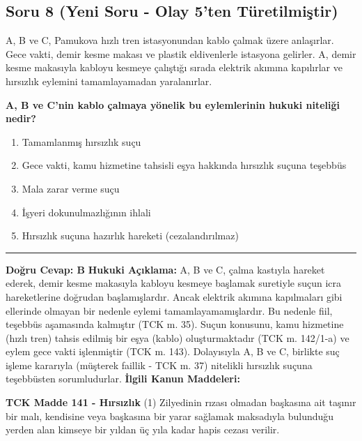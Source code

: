 \documentclass[a4paper, 11pt, twocolumn]{article}
\newenvironment{lawbox}{%
    \par\noindent
    \begin{tcolorbox}[
        colback=lawbg,
        colframe=boxcolor,
        fonttitle=\bfseries,
        boxrule=0.5pt,
        left=3pt,
        right=3pt,
        top=3pt,
        bottom=3pt,
        width=\columnwidth,
        arc=2pt,
        before skip=0.2cm,
        after skip=0.2cm
    ]
    \footnotesize\itshape
}{\end{tcolorbox}}
\begin{document}
\newpage

\subsection*{Soru 8 (Yeni Soru - Olay 5'ten Türetilmiştir)}
A, B ve C, Pamukova hızlı tren istasyonundan kablo çalmak üzere anlaşırlar. Gece vakti, demir kesme makası ve plastik eldivenlerle istasyona gelirler. A, demir kesme makasıyla kabloyu kesmeye çalıştığı sırada elektrik akımına kapılırlar ve hırsızlık eylemini tamamlayamadan yaralanırlar.

\textbf{A, B ve C'nin kablo çalmaya yönelik bu eylemlerinin hukuki niteliği nedir?}
\begin{enumerate}[label=\Alph*)]
    \item Tamamlanmış hırsızlık suçu
    \item Gece vakti, kamu hizmetine tahsisli eşya hakkında hırsızlık suçuna teşebbüs
    \item Mala zarar verme suçu
    \item İşyeri dokunulmazlığının ihlali
    \item Hırsızlık suçuna hazırlık hareketi (cezalandırılmaz)
\end{enumerate}
\vspace{0.5cm}
\hrule
\vspace{0.5cm}
\textbf{Doğru Cevap: B}
\newline
\textbf{Hukuki Açıklama:} A, B ve C, çalma kastıyla hareket ederek, demir kesme makasıyla kabloyu kesmeye başlamak suretiyle suçun icra hareketlerine doğrudan başlamışlardır. Ancak elektrik akımına kapılmaları gibi ellerinde olmayan bir nedenle eylemi tamamlayamamışlardır. Bu nedenle fiil, teşebbüs aşamasında kalmıştır (TCK m. 35). Suçun konusunu, kamu hizmetine (hızlı tren) tahsis edilmiş bir eşya (kablo) oluşturmaktadır (TCK m. 142/1-a) ve eylem gece vakti işlenmiştir (TCK m. 143). Dolayısıyla A, B ve C, birlikte suç işleme kararıyla (müşterek faillik - TCK m. 37) nitelikli hırsızlık suçuna teşebbüsten sorumludurlar.
\vspace{0.5cm}
\textbf{İlgili Kanun Maddeleri:}
\begin{lawbox}
\textbf{TCK Madde 141 - Hırsızlık}
\newline
(1) Zilyedinin rızası olmadan başkasına ait taşınır bir malı, kendisine veya başkasına bir yarar sağlamak maksadıyla bulunduğu yerden alan kimseye bir yıldan üç yıla kadar hapis cezası verilir.
\end{lawbox}
\end{document}
